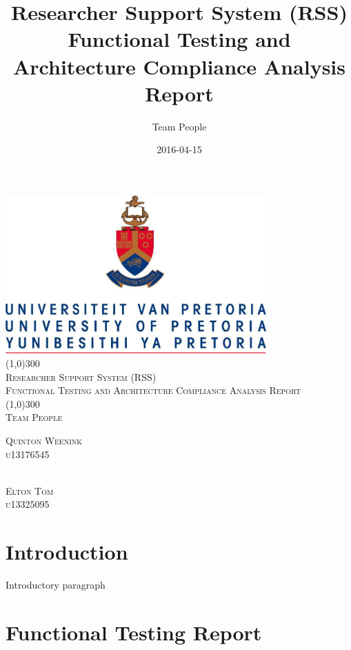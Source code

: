 \documentclass{article}
\title{
Researcher Support System (RSS)\\
Functional Testing and Architecture Compliance Analysis Report
}
\date{2016-04-15}
\author{Team People}
\begin{document}
\begin{titlepage}
	\begin{center}
		\includegraphics[width=10cm]{UP.jpg}  \\
		[1cm]
		\line(1,0){300} \\
		[0.3cm]
		\textsc{\Large
			Researcher Support System (RSS)\\
			Functional Testing and Architecture Compliance Analysis Report
		}\\
		[0.1cm]
		\line(1,0){300} \\
		[0.4cm]
		\textsc{\Large
			Team People
		} \\

	\end{center}
	\begin{flushright}
	\textsc{\Large
	Quinton Weenink\\ 
	u13176545\\
	}
	
	\textsc{\large\\
	Elton Tom\\ 
	u13325095\\ 
	}
	
	\end{flushright}
\end{titlepage}

\tableofcontents
\thispagestyle{empty}
\cleardoublepage

\setcounter{page}{1}
\section{Introduction}
Introductory paragraph

\newpage

\section{Functional Testing Report}
\end{document}
